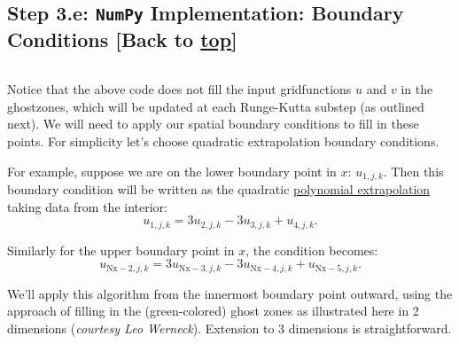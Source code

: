 \documentclass[landscape,letterpaper,10pt,english]{article}
\begin{document}
    \hypertarget{step-3.e-numpy-implementation-boundary-conditions-back-to-top}{%
\subsection{\texorpdfstring{Step 3.e: \texttt{NumPy} Implementation:
Boundary Conditions {[}Back to
\hyperref[toc]{top}{]}}{Step 3.e: NumPy Implementation: Boundary Conditions {[}Back to {]}}}\label{step-3.e-numpy-implementation-boundary-conditions-back-to-top}}

\[\label{numpy_bcs}\]

Notice that the above code does not fill the input gridfunctions \(u\)
and \(v\) in the ghostzones, which will be updated at each Runge-Kutta
substep (as outlined next). We will need to apply our spatial boundary
conditions to fill in these points. For simplicity let's choose
quadratic extrapolation boundary conditions.

For example, suppose we are on the lower boundary point in \(x\):
\(u_{1,j,k}\). Then this boundary condition will be written as the
quadratic
\href{https://en.wikipedia.org/wiki/Polynomial_interpolation}{polynomial
extrapolation} taking data from the interior: \[
u_{1,j,k} = 3 u_{2,j,k} - 3 u_{3,j,k} + u_{4,j,k}.
\]

Similarly for the upper boundary point in \(x\), the condition becomes:
\[
u_{\text{Nx}-2,j,k} = 3 u_{\text{Nx}-3,j,k} - 3 u_{\text{Nx}-4,j,k} + u_{\text{Nx}-5,j,k}.
\]

We'll apply this algorithm from the innermost boundary point outward,
using the approach of filling in the (green-colored) ghost zones as
illustrated here in 2 dimensions (\emph{courtesy Leo Werneck}).
Extension to 3 dimensions is straightforward.
\end{document}
